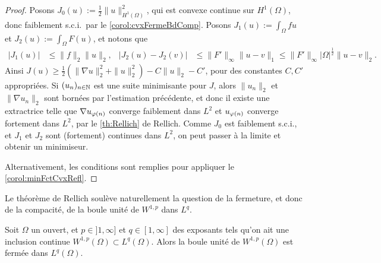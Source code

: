 \begin{proof}
	Posons $J_0(u) := \frac 1 2 \|u\|_{H^1(\Omega)}^2$, qui est convexe continue sur $H^1(\Omega)$, donc faiblement s.c.i.\ par le \cref{corol:cvxFermeBdComp}.
	Posons $J_1(u) := \int_\Omega f u$ et $J_2(u) := \int_\Omega F(u)$, et notons que 
	\begin{align*}
		|J_1(u)| &\leq \|f\|_2 \|u\|_2, &
		|J_2(u)-J_2(v)| &\leq \|F'\|_\infty \|u-v\|_1 \leq \|F'\|_\infty |\Omega|^\frac 1 2  \|u-v\|_2.
	\end{align*}
	Ainsi $J(u) \geq \frac 1 2 (\|\nabla u \|^2_2 + \|u\|^2_2) - C\|u\|_2 -C'$, pour des constantes $C,C'$ appropriées. Si $(u_n)_{n \in \mathbb{N}}$ est une suite minimisante pour $J$, alors $\|u_n\|_2$ et $\|\nabla u_n\|_2$ sont bornées par l'estimation précédente, et donc il existe une extractrice telle que $\nabla u_{\varphi(n)}$ converge faiblement dans $L^2$ et $u_{\varphi(n)}$ converge fortement dans $L^2$, par le \cref{th:Rellich} de Rellich. Comme $J_0$ est faiblement s.c.i., et $J_1$ et $J_2$ sont (fortement) continues dans $L^2$, on peut passer à la limite et obtenir un minimiseur. 
	
	Alternativement, les conditions sont remplies pour appliquer le \cref{corol:minFctCvxRefl}.
\end{proof}

Le théorème de Rellich soulève naturellement la question de la fermeture, et donc de la compacité, de la boule unité de $W^{1,p}$ dans $L^q$.  

\begin{remark}
\label{rem:bouleW1pFerme}
%
Soit $\Omega$ un ouvert, et $p \in ]1,\infty]$ et $q \in [1,\infty]$ des exposants tels qu'on ait une inclusion continue $W^{1,p}(\Omega) \subset L^q(\Omega)$. Alors la boule unité de $W^{1,p}(\Omega)$ est fermée dans $L^q(\Omega)$.  	
\end{remark}

